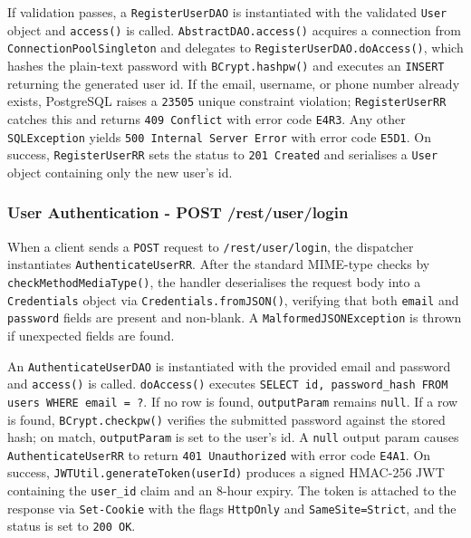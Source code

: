 If validation passes, a \texttt{RegisterUserDAO} is instantiated with the validated \texttt{User} object and \texttt{access()} is called. \texttt{AbstractDAO.access()} acquires a connection from \texttt{ConnectionPoolSingleton} and delegates to \texttt{RegisterUserDAO.doAccess()}, which hashes the plain-text password with \texttt{BCrypt.hashpw()} and executes an \texttt{INSERT} returning the generated user id. If the email, username, or phone number already exists, PostgreSQL raises a \texttt{23505} unique constraint violation; \texttt{RegisterUserRR} catches this and returns \texttt{409 Conflict} with error code \texttt{E4R3}. Any other \texttt{SQLException} yields \texttt{500 Internal Server Error} with error code \texttt{E5D1}. On success, \texttt{RegisterUserRR} sets the status to \texttt{201 Created} and serialises a \texttt{User} object containing only the new user's id.

\subsubsection*{User Authentication - POST /rest/user/login}

When a client sends a \texttt{POST} request to \texttt{/rest/user/login}, the dispatcher instantiates \texttt{AuthenticateUserRR}. After the standard MIME-type checks by \texttt{checkMethodMediaType()}, the handler deserialises the request body into a \texttt{Credentials} object via \texttt{Credentials.fromJSON()}, verifying that both \texttt{email} and \texttt{password} fields are present and non-blank. A \texttt{MalformedJSONException} is thrown if unexpected fields are found.

An \texttt{AuthenticateUserDAO} is instantiated with the provided email and password and \texttt{access()} is called. \texttt{doAccess()} executes \texttt{SELECT id, password\_hash FROM users WHERE email = ?}. If no row is found, \texttt{outputParam} remains \texttt{null}. If a row is found, \texttt{BCrypt.checkpw()} verifies the submitted password against the stored hash; on match, \texttt{outputParam} is set to the user's id. A \texttt{null} output param causes \texttt{AuthenticateUserRR} to return \texttt{401 Unauthorized} with error code \texttt{E4A1}. On success, \texttt{JWTUtil.generateToken(userId)} produces a signed HMAC-256 JWT containing the \texttt{user\_id} claim and an 8-hour expiry. The token is attached to the response via \texttt{Set-Cookie} with the flags \texttt{HttpOnly} and \texttt{SameSite=Strict}, and the status is set to \texttt{200 OK}.


